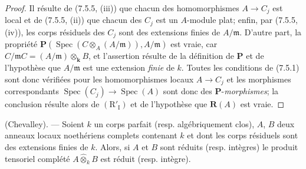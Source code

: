 \begin{proof}
Il résulte de (7.5.5, (iii)) que chacun des homomorphismes $A\to C_j$ est local
et de (7.5.5, (ii)) que chacun des $C_j$ est un $A$-module plat; enfin, par
(7.5.5, (iv)), les corps résiduels des $C_j$ sont des extensions finies de
$A/\mathfrak m$. D'autre part, la propriété
$\boldsymbol P(\operatorname{Spec}(C\otimes_A(A/\mathfrak m)),A/\mathfrak m)$
est vraie, car $C/\mathfrak mC=(A/\mathfrak m)\otimes_{\boldsymbol{k}}B$, et l'assertion
résulte de la définition de $\boldsymbol P$ et de l'hypothèse que
$A/\mathfrak m$ est une extension \emph{finie} de $k$. Toutes les conditions de
(7.5.1) sont donc vérifiées pour les homomorphismes locaux $A\to C_j$ et les
morphismes correspondants
$\operatorname{Spec}(C_j)\to\operatorname{Spec}(A)$ sont donc des
$\boldsymbol P$-\emph{morphismes}; la conclusion résulte alors de
$(\mathrm R'_{\mathrm I})$ et de l'hypothèse que $\boldsymbol R(A)$ est vraie.
\end{proof}

\begin{corollary}[7.5.7]
\label{IV.2.s7.5.7-fr}
(Chevalley). --- Soient $k$ un corps parfait \textup{(resp.} algébriquement clos), $A$,
$B$ deux anneaux locaux noethériens complets contenant $k$ et dont les corps
résiduels sont des extensions finies de $k$. Alors, si $A$ et $B$ sont réduits
\textup{(resp.} intègres) le produit tensoriel complété $A\widehat\otimes_k B$ est
réduit \textup{(resp.} intègre).
\end{corollary}

